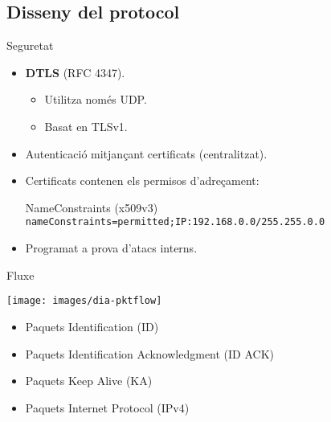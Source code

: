 \subsection{Disseny del protocol}
    \begin{frame}{Seguretat}
        \begin{itemize}
\item \textbf{DTLS} (RFC 4347).
        \begin{itemize}
            \item Utilitza només UDP.
            \item Basat en TLSv1.
        \end{itemize}
        \end{itemize}
        \begin{itemize}
\item Autenticació mitjançant certificats (centralitzat).
\item Certificats contenen els permisos d'adreçament:
        \begin{block}{NameConstraints (x509v3)}\small\tt
        nameConstraints=permitted;IP:192.168.0.0/255.255.0.0
        \end{block}
        \end{itemize}
        \begin{itemize}
\item Programat a prova d'atacs interns.
        \end{itemize}
    \end{frame}
    \begin{frame}{Fluxe}
        \begin{center}
        \texttt{[image: images/dia-pktflow]}
        \end{center}
        \begin{itemize}
\item Paquets Identification (ID)
\item Paquets Identification Acknowledgment (ID ACK)
\item Paquets Keep Alive (KA)
\item Paquets Internet Protocol (IPv4)
        \end{itemize}

    \end{frame}

